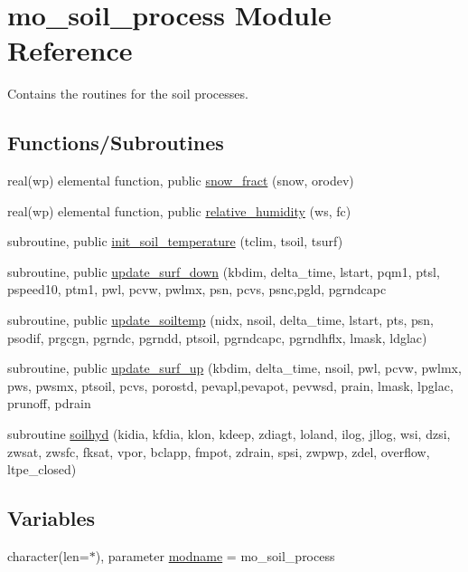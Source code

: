 \hypertarget{namespacemo__soil__process}{}\section{mo\+\_\+soil\+\_\+process Module Reference}
\label{namespacemo__soil__process}


Contains the routines for the soil processes.  


\subsection*{Functions/\+Subroutines}
\begin{DoxyCompactItemize}
\item 
real(wp) elemental function, public \hyperlink{namespacemo__soil__process_a20c4b80ccc8a10cb3028ff15293d3cc0}{snow\+\_\+fract} (snow, orodev)
\item 
real(wp) elemental function, public \hyperlink{namespacemo__soil__process_ae91447aa4654c4a406dedd04c5c4daf0}{relative\+\_\+humidity} (ws, fc)
\item 
subroutine, public \hyperlink{namespacemo__soil__process_aefac72c5fad9c92d8fa6c646fcd13f3b}{init\+\_\+soil\+\_\+temperature} (tclim, tsoil, tsurf)
\item 
subroutine, public \hyperlink{namespacemo__soil__process_a7dd6c425ac02aef924fb1fa3de6b373d}{update\+\_\+surf\+\_\+down} (kbdim, delta\+\_\+time, lstart, pqm1, ptsl, pspeed10, ptm1, pwl, pcvw, pwlmx, psn, pcvs, psnc,pgld, pgrndcapc
\item 
subroutine, public \hyperlink{namespacemo__soil__process_a9f2a04bdb962c1615ee419e1c62d6870}{update\+\_\+soiltemp} (nidx, nsoil, delta\+\_\+time, lstart, pts, psn, psodif, prgcgn, pgrndc, pgrndd, ptsoil, pgrndcapc, pgrndhflx, lmask, ldglac)
\item 
subroutine, public \hyperlink{namespacemo__soil__process_a6baae437b29f7d04d8bb10cb1d52249f}{update\+\_\+surf\+\_\+up} (kbdim, delta\+\_\+time, nsoil, pwl, pcvw, pwlmx, pws, pwsmx, ptsoil, pcvs, porostd, pevapl,pevapot, pevwsd, prain, lmask, lpglac, prunoff, pdrain
\item 
subroutine \hyperlink{namespacemo__soil__process_a4063fcd30b65b8bb38b532cfe884feb7}{soilhyd} (kidia, kfdia, klon, kdeep, zdiagt, loland, ilog, jllog, wsi, dzsi, zwsat, zwsfc, fksat, vpor, bclapp, fmpot, zdrain, spsi, zwpwp, zdel, overflow, ltpe\+\_\+closed)
\end{DoxyCompactItemize}
\subsection*{Variables}
\begin{DoxyCompactItemize}
\item 
character(len=$\ast$), parameter \hyperlink{namespacemo__soil__process_ad7dacf511801f2d14d39a64fe6bfe6d2}{modname} = \textquotesingle{}mo\+\_\+soil\+\_\+process\textquotesingle{}
\end{DoxyCompactItemize}


